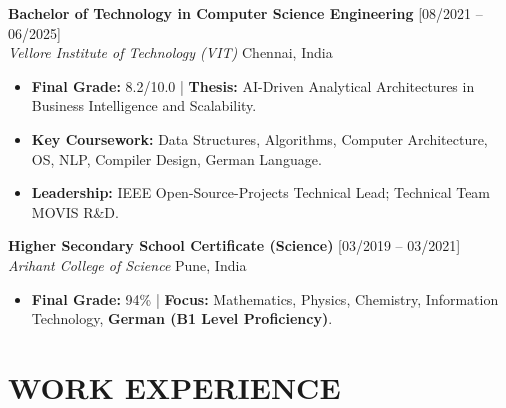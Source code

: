 \documentclass[10pt, a4paper]{article}
\begin{document}
\vspace{4pt}
\textbf{Bachelor of Technology in Computer Science Engineering} \hfill [08/2021 – 06/2025] \\
\textit{Vellore Institute of Technology (VIT)} \hfill Chennai, India
\begin{itemize}
    \item \textbf{Final Grade:} 8.2/10.0 | \textbf{Thesis:} AI-Driven Analytical Architectures in Business Intelligence and Scalability.
    \item \textbf{Key Coursework:} Data Structures, Algorithms, Computer Architecture, OS, NLP, Compiler Design, German Language.
    \item \textbf{Leadership:} IEEE Open-Source-Projects Technical Lead; Technical Team MOVIS R\&D.
\end{itemize}

\vspace{4pt}
\textbf{Higher Secondary School Certificate (Science)} \hfill [03/2019 – 03/2021] \\
\textit{Arihant College of Science} \hfill Pune, India
\begin{itemize}
    \item \textbf{Final Grade:} 94\% | \textbf{Focus:} Mathematics, Physics, Chemistry, Information Technology, \textbf{German (B1 Level Proficiency)}.
\end{itemize}

\section{WORK EXPERIENCE}
\end{document}
